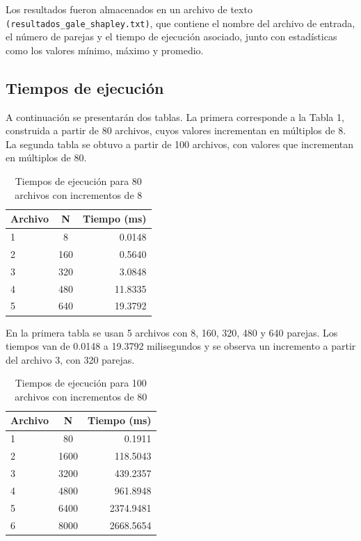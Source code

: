 \documentclass{article}
\begin{document}
Los resultados fueron almacenados en un archivo de texto \texttt{(resultados\_gale\_shapley.txt)}, que contiene el nombre del archivo de entrada, el número de parejas y el tiempo de ejecución asociado, junto con estadísticas como los valores mínimo, máximo y promedio.

\subsection{Tiempos de ejecución}
A continuación se presentarán dos tablas. La primera corresponde a la Tabla 1, construida a partir de 80 archivos, cuyos valores incrementan en múltiplos de 8. La segunda tabla se obtuvo a partir de 100 archivos, con valores que incrementan en múltiplos de 80.

\begin{table}[H] %
  \centering
  \caption{Tiempos de ejecución para 80 archivos con incrementos de 8}
  \label{tab:tabla1}
  \begin{tabularx}{0.48\textwidth}{|X|c|r|}
    \hline
    Archivo & N & Tiempo (ms) \\
    \hline
    1  & 8   & 0.0148  \\
    \hline
    2  & 160 & 0.5640  \\
    \hline
    3  & 320 & 3.0848  \\
    \hline
    4  & 480 & 11.8335 \\
    \hline
    5  & 640 & 19.3792 \\
    \hline
  \end{tabularx}
\end{table}

En la primera tabla se usan 5 archivos con 8, 160, 320, 480 y 640 parejas. Los tiempos van de 0.0148 a 19.3792 milisegundos y se observa un incremento a partir del archivo 3, con 320 parejas.

\begin{table}[H] %
  \centering
  \caption{Tiempos de ejecución para 100 archivos con incrementos de 80}
  \label{tab:tabla2}
  \begin{tabularx}{0.48\textwidth}{|X|c|r|}
    \hline
    Archivo & N & Tiempo (ms) \\
    \hline
    1  & 80   & 0.1911    \\
    \hline
    2  & 1600 & 118.5043  \\
    \hline
    3  & 3200 & 439.2357  \\
    \hline
    4  & 4800 & 961.8948  \\
    \hline
    5  & 6400 & 2374.9481 \\
    \hline
    6  & 8000 & 2668.5654 \\
    \hline
  \end{tabularx}
\end{table}
\end{document}

